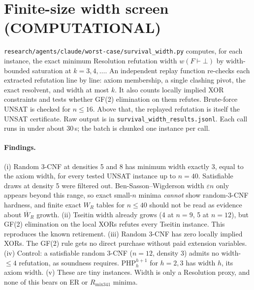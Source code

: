\documentclass[11pt]{article}
\begin{document}
\section{Finite-size width screen (COMPUTATIONAL)}
\texttt{research/agents/claude/worst-case/survival\_width.py} computes, for each instance, the exact minimum Resolution refutation width $w(F\vdash\bot)$ by width-bounded saturation at $k=3,4,\dots$. An independent replay function re-checks each extracted refutation line by line: axiom membership, a single clashing pivot, the exact resolvent, and width at most $k$. It also counts locally implied XOR constraints and tests whether GF(2) elimination on them refutes. Brute-force UNSAT is checked for $n\le16$. Above that, the replayed refutation is itself the UNSAT certificate. Raw output is in \texttt{survival\_width\_results.jsonl}. Each call runs in under about 30\,s; the batch is chunked one instance per call.

\paragraph{Findings.}
(i) Random 3-CNF at densities 5 and 8 has minimum width exactly 3, equal to the axiom width, for every tested UNSAT instance up to $n=40$. Satisfiable draws at density 5 were filtered out. Ben-Sasson--Wigderson width $\varepsilon n$ only appears beyond this range, so exact small-$n$ minima \emph{cannot} show random-3-CNF hardness, and finite exact $W_R$ tables for $n\le40$ should not be read as evidence about $\overline W_R$ growth.
(ii) Tseitin width already grows (4 at $n=9$, 5 at $n=12$), but GF(2) elimination on the local XORs refutes every Tseitin instance. This reproduces the known retirement.
(iii) Random 3-CNF has zero locally implied XORs. The GF(2) rule gets no direct purchase without paid extension variables.
(iv) Control: a satisfiable random 3-CNF ($n=12$, density 3) admits no width-$\le4$ refutation, as soundness requires. PHP$^{h+1}_h$ for $h=2,3$ has width $h$, its axiom width. (v) These are tiny instances. Width is only a Resolution proxy, and none of this bears on ER or $R_{\mathrm{mix341}}$ minima.
\end{document}
